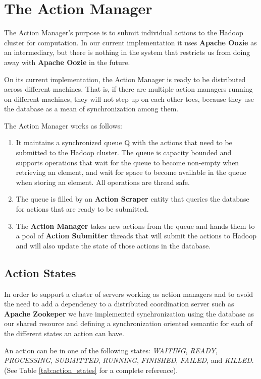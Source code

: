 \section{The Action Manager}
The Action Manager's purpose is to submit individual actions to the Hadoop cluster for computation. In our current implementation it uses \textbf{Apache Oozie} as an intermediary, but there is nothing in the system that restricts us from doing away with \textbf{Apache Oozie} in the future.

On its current implementation, the Action Manager is ready to be distributed across different machines. That is, if there are multiple action managers running on different machines, they will not step up on each other toes, because they use the database as a mean of synchronization among them.

The Action Manager works as follows:

\begin{enumerate}
\item It maintains a synchronized queue Q with the actions that need to be submitted to the Hadoop cluster. The queue is capacity bounded and supports operations that wait for the queue to become non-empty when retrieving an element, and wait for space to become available in the queue when storing an element. All operations are thread safe.
\item The queue is filled by an \textbf{Action Scraper} entity that queries the database for actions that are ready to be submitted.
\item The \textbf{Action Manager} takes new actions from the queue and hands them to a pool of \textbf{Action Submitter} threads that will submit the actions to Hadoop and will also update the state of those actions in the database.
\end{enumerate}

\subsection{Action States}
In order to support a cluster of servers working as action managers and to avoid the need to add a dependency to a distributed coordination server such as \textbf{Apache Zookeper} we have implemented synchronization using the database as our shared resource and defining a synchronization oriented semantic for each of the different states an action can have.

An action can be in one of the following states: \textit{WAITING}, \textit{READY}, \textit{PROCESSING}, \textit{SUBMITTED}, \textit{RUNNING}, \textit{FINISHED}, \textit{FAILED}, and \textit{KILLED}.  (See Table \ref{tab:action_states} for a complete reference).

